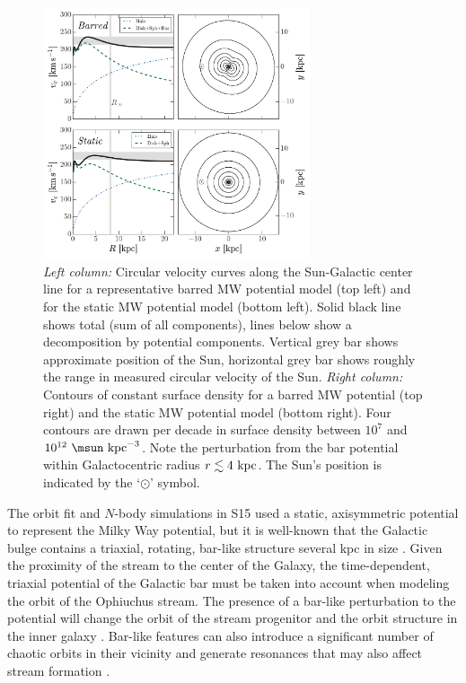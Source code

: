 \documentclass[numberedappendix]{emulateapj}
\begin{document}
\begin{figure}[!tbp]
\begin{center}
\includegraphics[width=0.7\textwidth]{figures/potentials-four}
\caption{{\it Left column:} Circular velocity curves along the Sun-Galactic center line for a representative barred MW potential model (top left) and for the static MW potential model (bottom left). Solid black line shows total (sum of all components), lines below show a decomposition by potential components. Vertical grey bar shows approximate position of the Sun, horizontal grey bar shows roughly the range in measured circular velocity of the Sun. {\it Right column:} Contours of constant surface density for a barred MW potential (top right) and the static MW potential model (bottom right). Four contours are drawn per decade in surface density between $10^7$ and $10^{12}~\msun~{\rm kpc}^{-3}$. Note the perturbation from the bar potential within Galactocentric radius $r \lesssim 4~{\rm kpc}$. The Sun's position is indicated by the `$\odot$' symbol. }
\label{fig:potentials}
\end{center}
\end{figure}

The orbit fit and $N$-body simulations in S15 used a static, axisymmetric potential to represent the Milky Way potential, but it is well-known that the Galactic bulge contains a triaxial, rotating, bar-like structure several kpc in size \citep[e.g.,][]{blitz91, weinberg92, dwek95, wegg13}. Given the proximity of the stream to the center of the Galaxy, the time-dependent, triaxial potential of the Galactic bar must be taken into account when modeling the orbit of the Ophiuchus stream. The presence of a bar-like perturbation to the potential will change the orbit of the stream progenitor and the orbit structure in the inner galaxy \citep{zotos12, portail15b, gajda15}. Bar-like features can also introduce a significant number of chaotic orbits in their vicinity \citep{weinberg15} and generate resonances that may also affect stream formation \citep{hattori15}.
\end{document}
